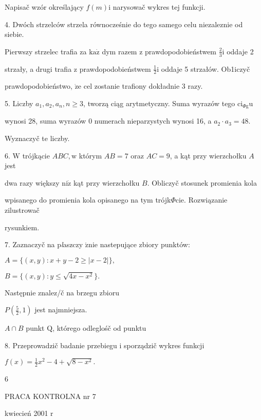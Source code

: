\documentclass[a4paper,12pt]{article}
\begin{document}
Napisač wzór określający $f(m)\mathrm{i}$ narysowač wykres tej funkcji.

4. Dwóch strzelców strzela równocześnie do tego samego celu niezaleznie od siebie.

Pierwszy strzelec trafia za $\mathrm{k}\mathrm{a}\dot{\mathrm{z}}$ dym razem $\mathrm{z}$ prawdopodobieństwem $\displaystyle \frac{2}{3} \mathrm{i}$ oddaje 2

strzały, a drugi trafia $\mathrm{z}$ prawdopodobieństwem $\displaystyle \frac{1}{2} \mathrm{i}$ oddaje 5 strzałów. Ob1iczyč

prawdopodobieństwo, $\dot{\mathrm{z}}\mathrm{e}$ cel zostanie trafiony dokładnie 3 razy.

5. Liczby $a_{1}, a_{2}, a_{n},  n\geq 3$, tworzą ciąg arytmetyczny. Suma wyrazów tego $\mathrm{c}\mathrm{i}_{\Phi \mathrm{g}}\mathrm{u}$

wynosi 28, suma wyrazów $0$ numerach nieparzystych wynosi 16, a $a_{2}\cdot a_{3}=48.$

Wyznaczyč te liczby.

6. $\mathrm{W}$ trójkącie $ABC, \mathrm{w}$ którym $AB=7$ oraz $AC=9$, a kąt przy wierzchołku $A$ jest

dwa razy większy $\mathrm{n}\mathrm{i}\dot{\mathrm{z}}$ kąt przy wierzchołku $B$. Obliczyč stosunek promienia kola

wpisanego do promienia kola opisanego na tym trójk$\Phi$cie. Rozwiązanie zilustrowač

rysunkiem.

7. Zaznaczyč na p{\it l}aszczy $\acute{\mathrm{z}}\mathrm{n}\mathrm{i}\mathrm{e}$ nastepujące zbiory punktów:

$A=\{(x,y):x+y-2\geq|x-2|\},$

$B=\{(x,y):y\leq\sqrt{4x-x^{2}}\}.$

Następnie znalez/č na brzegu zbioru

$P(\displaystyle \frac{5}{2},1)$ jest najmniejsza.

$A\cap B$ punkt $\mathrm{Q}$, którego odleglośč od punktu

8. Przeprowadzič badanie przebiegu i sporządzič wykres funkcji

$f(x)=\displaystyle \frac{1}{2}x^{2}-4+\sqrt{8-x^{2}}.$

6





PRACA KONTROLNA nr 7

kwiecień 2001 $\mathrm{r}$
\end{document}

